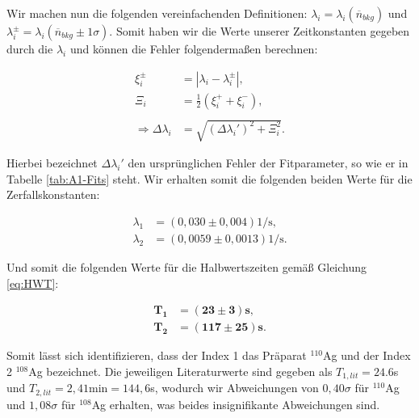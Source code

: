 \documentclass{article}
\begin{document}
\phantom{.}

Wir machen nun die folgenden vereinfachenden Definitionen: $\lambda_i = \lambda_i(\overline{n}_{bkg})$ und $\lambda_i^\pm = \lambda_i(\overline{n}_{bkg} \pm 1\sigma)$. Somit haben wir die Werte unserer Zeitkonstanten gegeben durch die $\lambda_i$ und können die Fehler folgendermaßen berechnen:

\begin{equation}
    \begin{split}
        \xi_i^\pm &= |\lambda_i - \lambda_i^\pm|, \\
        \Xi_i &= \frac{1}{2} (\xi_i^+ + \xi_i^-), \\ \\
        \Rightarrow \Delta \lambda_i &= \sqrt{(\Delta \lambda_i')^2 + \Xi_i^2}.
    \end{split}
\end{equation}

Hierbei bezeichnet $\Delta \lambda_i'$ den ursprünglichen Fehler der Fitparameter, so wie er in Tabelle \ref{tab:A1-Fits} steht. Wir erhalten somit die folgenden beiden Werte für die Zerfallskonstanten:

\begin{equation}
    \begin{split}
        {\lambda_1} &= {(0,030 \pm 0,004)} \text{1/s}, \\
        {\lambda_2} &= {(0,0059 \pm 0,0013)} \text{1/s}.
    \end{split}
\end{equation}

Und somit die folgenden Werte für die Halbwertszeiten gemäß Gleichung \ref{eq:HWT}:

\begin{equation}
    \begin{split}
        \bm{T_1} &= \bm{(23 \pm 3)} \textbf{s}, \\
        \bm{T_2} &= \bm{(117 \pm 25)} \textbf{s}.
    \end{split}
\end{equation}

Somit lässt sich identifizieren, dass der Index 1 das Präparat $^{110}$Ag und der Index 2 $^{108}$Ag bezeichnet. Die jeweiligen Literaturwerte sind gegeben als $T_{1,lit} = 24.6$s und $T_{2,lit} = 2,41 \text{min} = 144,6$s, wodurch wir Abweichungen von $0,40\sigma$ für $^{110}$Ag und $1,08\sigma$ für $^{108}$Ag erhalten, was beides insignifikante Abweichungen sind. 
\end{document}
